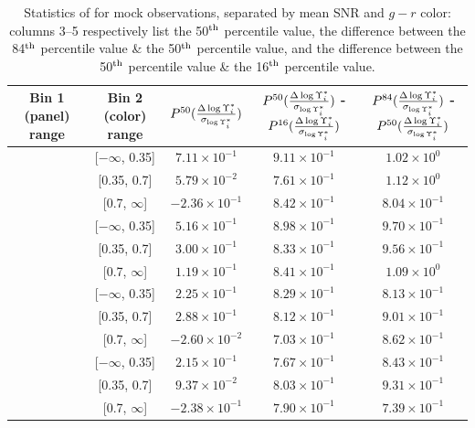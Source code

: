 \begin{table}[p]
    \centering
    \begin{tabular}{||c|c|c|c|c||} \hline \hline
        Bin 1 (panel) range & Bin 2 (color) range & $P^{50}(\frac{\Delta \log \Upsilon^*_{i}}{\sigma_{\log \Upsilon^*_{i}}})$ & $P^{50}(\frac{\Delta \log \Upsilon^*_{i}}{\sigma_{\log \Upsilon^*_{i}}})$  - $P^{16}(\frac{\Delta \log \Upsilon^*_{i}}{\sigma_{\log \Upsilon^*_{i}}})$ & $P^{84}(\frac{\Delta \log \Upsilon^*_{i}}{\sigma_{\log \Upsilon^*_{i}}})$ - $P^{50}(\frac{\Delta \log \Upsilon^*_{i}}{\sigma_{\log \Upsilon^*_{i}}})$ \\ \hline \hline
        [$-\infty$, 2.0] & [$-\infty$, 0.35] & $7.11 \times 10^{-1}$ & $9.11 \times 10^{-1}$ & $1.02 \times 10^{0}$ \\ \hline
        [$-\infty$, 2.0] & [0.35, 0.7] & $5.79 \times 10^{-2}$ & $7.61 \times 10^{-1}$ & $1.12 \times 10^{0}$ \\ \hline
        [$-\infty$, 2.0] & [0.7, $\infty$] & $-2.36 \times 10^{-1}$ & $8.42 \times 10^{-1}$ & $8.04 \times 10^{-1}$ \\ \hline
        [2.0, 10.0] & [$-\infty$, 0.35] & $5.16 \times 10^{-1}$ & $8.98 \times 10^{-1}$ & $9.70 \times 10^{-1}$ \\ \hline
        [2.0, 10.0] & [0.35, 0.7] & $3.00 \times 10^{-1}$ & $8.33 \times 10^{-1}$ & $9.56 \times 10^{-1}$ \\ \hline
        [2.0, 10.0] & [0.7, $\infty$] & $1.19 \times 10^{-1}$ & $8.41 \times 10^{-1}$ & $1.09 \times 10^{0}$ \\ \hline
        [10.0, 20.0] & [$-\infty$, 0.35] & $2.25 \times 10^{-1}$ & $8.29 \times 10^{-1}$ & $8.13 \times 10^{-1}$ \\ \hline
        [10.0, 20.0] & [0.35, 0.7] & $2.88 \times 10^{-1}$ & $8.12 \times 10^{-1}$ & $9.01 \times 10^{-1}$ \\ \hline
        [10.0, 20.0] & [0.7, $\infty$] & $-2.60 \times 10^{-2}$ & $7.03 \times 10^{-1}$ & $8.62 \times 10^{-1}$ \\ \hline
        [20.0, $\infty$] & [$-\infty$, 0.35] & $2.15 \times 10^{-1}$ & $7.67 \times 10^{-1}$ & $8.43 \times 10^{-1}$ \\ \hline
        [20.0, $\infty$] & [0.35, 0.7] & $9.37 \times 10^{-2}$ & $8.03 \times 10^{-1}$ & $9.31 \times 10^{-1}$ \\ \hline
        [20.0, $\infty$] & [0.7, $\infty$] & $-2.38 \times 10^{-1}$ & $7.90 \times 10^{-1}$ & $7.39 \times 10^{-1}$ \\ \hline
    \end{tabular}
    \caption[Statistics of  for mock observations, separated by mean SNR and $g - r$ color]{\fixspacing Statistics of  for mock observations, separated by mean SNR and $g - r$ color: columns 3--5 respectively list the 50$^{\rm th}$ percentile value, the difference between the 84$^{\rm th}$ percentile value \& the 50$^{\rm th}$ percentile value, and the difference between the 50$^{\rm th}$ percentile value \& the 16$^{\rm th}$ percentile value.}
    \label{tab:mocks_snr_color_devwidMLi}
\end{table}

